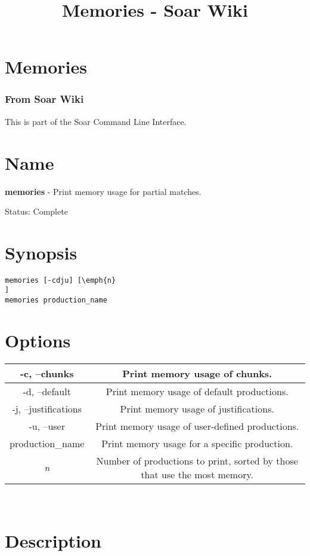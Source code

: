 \documentclass[10pt]{article}
\title{Memories - Soar Wiki}
\begin{document}
\section*{Memories}
\subsubsection*{From Soar Wiki}


 This is part of the Soar Command Line Interface. 
\section*{ Name }


 \textbf{memories}
 - Print memory usage for partial matches. 


 Status: Complete
\section*{ Synopsis }
\begin{verbatim}
memories [-cdju] [\emph{n}
]
memories production_name 

\end{verbatim}
\section*{ Options }


\begin{tabular}{|c|c|}
\hline 
 -c, --chunks  & Print memory usage of chunks.  \\
 \hline 
 -d, --default  & Print memory usage of default productions.  \\
 \hline 
 -j, --justifications  & Print memory usage of justifications.  \\
 \hline 
 -u, --user  & Print memory usage of user-defined productions.  \\
 \hline 
production\_name & Print memory usage for a specific production.  \\
 \hline 
\emph{n}
 & Number of productions to print, sorted by those that use the most memory.  \\
 \hline 

\end{tabular}



 \\ 

\section*{ Description }
\end{document}
